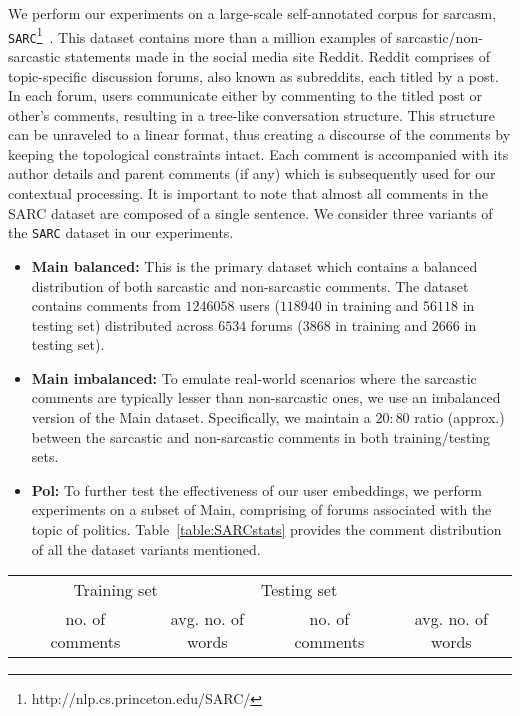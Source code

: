 \documentclass[11pt]{article}
\begin{document}
{We perform our experiments on a large-scale self-annotated corpus for sarcasm, \verb|SARC|\footnote{http://nlp.cs.princeton.edu/SARC/}~\cite{khodak2017large}. This dataset contains more than a million examples of sarcastic/non-sarcastic statements made in the social media site Reddit. Reddit comprises of topic-specific discussion forums, also known as subreddits, each titled by a post. In each forum, users communicate either by commenting to the titled post or other's comments, resulting in a tree-like conversation structure. This structure can be unraveled to a linear format, thus creating a discourse of the comments by keeping the topological constraints intact. Each comment is accompanied with its author details and parent comments (if any) which is subsequently used for our contextual processing. It is important to note that almost all comments in the SARC dataset are composed of a single sentence. We consider three variants of the \verb|SARC| dataset in our experiments. 
\begin{itemize}[leftmargin=*]
\itemsep0em 
\item \textbf{Main balanced:} This is the primary dataset which contains a balanced distribution of both sarcastic and non-sarcastic comments. The dataset contains comments from $1246058$ users ($118940$ in training and $56118$ in testing set) distributed across $6534$ forums ($3868$ in training and $2666$ in testing set).
\item \textbf{Main imbalanced:} To emulate real-world scenarios where the sarcastic comments are typically lesser than non-sarcastic ones, we use an imbalanced version of the Main dataset. Specifically, we maintain a $20:80$ ratio (approx.) between the sarcastic and non-sarcastic comments in both training/testing sets.
\item \textbf{Pol:} To further test the effectiveness of our user embeddings, we perform experiments on a subset of Main, comprising of forums associated with the topic of politics. Table~\ref{table:SARCstats} provides the comment distribution of all the dataset variants mentioned. 
\end{itemize}
\begin{table}[h!]
	\small
	\begin{center}
		\begin{tabular}{c|c|c|c|c|c|c|c|c|c}
			\Xhline{3\arrayrulewidth}
			\multicolumn{2}{c|}{}&\multicolumn{4}{c}{Training set}&\multicolumn{4}{|c}{Testing set}\\ \cline{3-10}
            \multicolumn{2}{c|}{}&\multicolumn{2}{c|}{\multirow{2}{*}{no. of comments}}&\multicolumn{2}{c|}{avg. no. of words }&\multicolumn{2}{c|}{\multirow{2}{*}{no. of comments}}&\multicolumn{2}{c}{avg. no. of words}\\ 
            

\end{tabular}
\end{center}
\end{table}}
\end{document}
